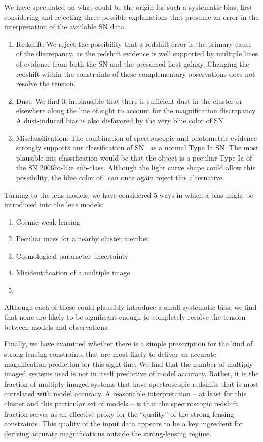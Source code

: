We have speculated on what could be the origin for such a systematic
bias, first considering and rejecting three possible explanations that
presume an error in the interpretation of the available SN data.

\begin{enumerate}
\item Redshift: We reject the possibility that a redshift error is the primary cause
of the discrepancy, as the redshift evidence is well supported by
multiple lines of evidence from both the SN and the presumed host
galaxy. Changing the redshift within the constraints of these
complementary observations does not resolve the tension. 
\item Dust: We find
it implausible that there is sufficient dust in the cluster or
elsewhere along the line of sight to account for the magnification
discrepancy.  A dust-induced bias is also disfavored by the very blue
color of SN \tomas.
\item Misclassification: The combination of spectroscopic and
photometric evidence strongly supports our classification of
SN \tomas\ as a normal Type Ia SN.  The most plausible
mis-classification would be that the object is a peculiar Type Ia of
the SN 2006bt-like sub-class.  Although the light curve shape could
allow this possibility, the blue color of \tomas\ can once again
reject this alternative. 
\end{enumerate}

\noindent 

Turning to the lens models, we have considered 5 ways in which a bias
might be introduced into the lens models:

\begin{enumerate}
\item Cosmic weak lensing 
\item Peculiar mass for a nearby cluster member
\item Cosmological parameter uncertainty
\item Misidentification of a multiple image
\item {}
\end{enumerate}

\noindent
Although each of these could plausibly introduce a small systematic
bias, we find that none are likely to be significant enough  to completely resolve the tension between models and
observations.  

Finally, we have examined whether there is a simple prescription for
the kind of strong lensing constraints that are most likely to deliver
an accurate magnification prediction for this sight-line. 
 We find
that the number of multiply imaged systems used is not in itself
predictive of model accuracy.  Rather, it is the fraction of multiply
imaged systems that have spectroscopic redshifts that is most
correlated with model accuracy.  A reasonable interpretation 
-- at least for this cluster and this particular set of models -- is
that the spectroscopic redshift fraction serves as an effective proxy
for the ``quality'' of the strong lensing constraints. This quality of
the input data appears to be a key ingredient for deriving accurate
magnifications outside the strong-lensing regime. 

